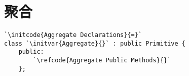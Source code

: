 \section{聚合}\label{sec:聚合}

\begin{lstlisting}
`\initcode{Aggregate Declarations}{=}`
class `\initvar{Aggregate}{}` : public Primitive {
    public:
        `\refcode{Aggregate Public Methods}{}`
    };
\end{lstlisting}